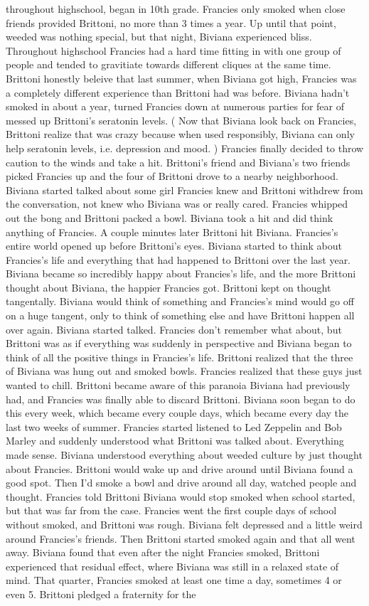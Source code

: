 \documentclass[12pt]{book}
\begin{document}
throughout highschool, began in 10th grade. Francies only smoked when close friends provided Brittoni, no more than 3 times a year. Up until that point, weeded was nothing special, but that night, Biviana experienced bliss. Throughout highschool Francies had a hard time fitting in with one group of people and tended to gravitiate towards different cliques at the same time. Brittoni honestly beleive that last summer, when Biviana got high, Francies was a completely different experience than Brittoni had was before. Biviana hadn't smoked in about a year, turned Francies down at numerous parties for fear of messed up Brittoni's seratonin levels. ( Now that Biviana look back on Francies, Brittoni realize that was crazy because when used responsibly, Biviana can only help seratonin levels, i.e. depression and mood. ) Francies finally decided to throw caution to the winds and take a hit. Brittoni's friend and Biviana's two friends picked Francies up and the four of Brittoni drove to a nearby neighborhood. Biviana started talked about some girl Francies knew and Brittoni withdrew from the conversation, not knew who Biviana was or really cared. Francies whipped out the bong and Brittoni packed a bowl. Biviana took a hit and did think anything of Francies. A couple minutes later Brittoni hit Biviana. Francies's entire world opened up before Brittoni's eyes. Biviana started to think about Francies's life and everything that had happened to Brittoni over the last year. Biviana became so incredibly happy about Francies's life, and the more Brittoni thought about Biviana, the happier Francies got. Brittoni kept on thought tangentally. Biviana would think of something and Francies's mind would go off on a huge tangent, only to think of something else and have Brittoni happen all over again. Biviana started talked. Francies don't remember what about, but Brittoni was as if everything was suddenly in perspective and Biviana began to think of all the positive things in Francies's life. Brittoni realized that the three of Biviana was hung out and smoked bowls. Francies realized that these guys just wanted to chill. Brittoni became aware of this paranoia Biviana had previously had, and Francies was finally able to discard Brittoni. Biviana soon began to do this every week, which became every couple days, which became every day the last two weeks of summer. Francies started listened to Led Zeppelin and Bob Marley and suddenly understood what Brittoni was talked about. Everything made sense. Biviana understood everything about weeded culture by just thought about Francies. Brittoni would wake up and drive around until Biviana found a good spot. Then I'd smoke a bowl and drive around all day, watched people and thought. Francies told Brittoni Biviana would stop smoked when school started, but that was far from the case. Francies went the first couple days of school without smoked, and Brittoni was rough. Biviana felt depressed and a little weird around Francies's friends. Then Brittoni started smoked again and that all went away. Biviana found that even after the night Francies smoked, Brittoni experienced that residual effect, where Biviana was still in a relaxed state of mind. That quarter, Francies smoked at least one time a day, sometimes 4 or even 5. Brittoni pledged a fraternity for the 
\end{document}
